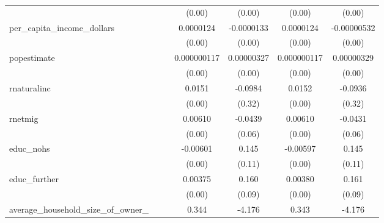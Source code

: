 {\begin{tabular}{l*{6}{c}}
            &                     &                     &      (0.00)         &      (0.00)         &      (0.00)         &      (0.00)         \\
[1em]
per\_capita\_income\_dollars&                     &                     &   0.0000124\sym{***}&  -0.0000133         &   0.0000124\sym{***}& -0.00000532         \\
            &                     &                     &      (0.00)         &      (0.00)         &      (0.00)         &      (0.00)         \\
[1em]
popestimate &                     &                     & 0.000000117\sym{***}&  0.00000327         & 0.000000117\sym{***}&  0.00000329         \\
            &                     &                     &      (0.00)         &      (0.00)         &      (0.00)         &      (0.00)         \\
[1em]
rnaturalinc &                     &                     &      0.0151\sym{**} &     -0.0984         &      0.0152\sym{**} &     -0.0936         \\
            &                     &                     &      (0.00)         &      (0.32)         &      (0.00)         &      (0.32)         \\
[1em]
rnetmig     &                     &                     &     0.00610\sym{***}&     -0.0439         &     0.00610\sym{***}&     -0.0431         \\
            &                     &                     &      (0.00)         &      (0.06)         &      (0.00)         &      (0.06)         \\
[1em]
educ\_nohs   &                     &                     &    -0.00601\sym{***}&       0.145         &    -0.00597\sym{***}&       0.145         \\
            &                     &                     &      (0.00)         &      (0.11)         &      (0.00)         &      (0.11)         \\
[1em]
educ\_further&                     &                     &     0.00375\sym{**} &       0.160         &     0.00380\sym{**} &       0.161         \\
            &                     &                     &      (0.00)         &      (0.09)         &      (0.00)         &      (0.09)         \\
[1em]
average\_household\_size\_of\_owner\_&                     &                     &       0.344\sym{***}&      -4.176         &       0.343\sym{***}&      -4.176         \\

\end{tabular}}

